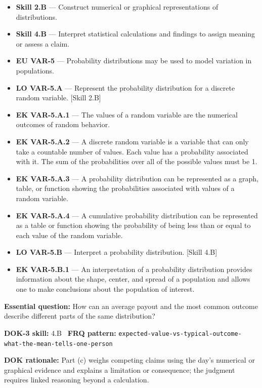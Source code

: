 \documentclass[11pt]{article}
\begin{document}


{\small
\begin{itemize}[leftmargin=1.5em,itemsep=2pt,topsep=2pt]
  \item \textbf{Skill 2.B} --- Construct numerical or graphical representations of distributions.
  \item \textbf{Skill 4.B} --- Interpret statistical calculations and findings to assign meaning or assess a claim.
  \item \textbf{EU VAR-5} --- Probability distributions may be used to model variation in populations.
  \item \textbf{LO VAR-5.A} --- Represent the probability distribution for a discrete random variable. [Skill 2.B]
  \item \textbf{EK VAR-5.A.1} --- The values of a random variable are the numerical outcomes of random behavior.
  \item \textbf{EK VAR-5.A.2} --- A discrete random variable is a variable that can only take a countable number of values. Each value has a probability associated with it. The sum of the probabilities over all of the possible values must be 1.
  \item \textbf{EK VAR-5.A.3} --- A probability distribution can be represented as a graph, table, or function showing the probabilities associated with values of a random variable.
  \item \textbf{EK VAR-5.A.4} --- A cumulative probability distribution can be represented as a table or function showing the probability of being less than or equal to each value of the random variable.
  \item \textbf{LO VAR-5.B} --- Interpret a probability distribution. [Skill 4.B]
  \item \textbf{EK VAR-5.B.1} --- An interpretation of a probability distribution provides information about the shape, center, and spread of a population and allows one to make conclusions about the population of interest.
\end{itemize}
}
\textbf{Essential question:} How can an average payout and the most common outcome describe different parts of the same distribution?\par
\textbf{DOK-3 skill:} 4.B \textperiodcentered\ \textbf{FRQ pattern:} {\small\texttt{expected-\allowbreak{}value-\allowbreak{}vs-\allowbreak{}typical-\allowbreak{}outcome-\allowbreak{}what-\allowbreak{}the-\allowbreak{}mean-\allowbreak{}tells-\allowbreak{}one-\allowbreak{}person}}\par
\textbf{DOK rationale:} Part (c) weighs competing claims using the day's numerical or graphical evidence and explains a limitation or consequence; the judgment requires linked reasoning beyond a calculation.\par
\end{document}
